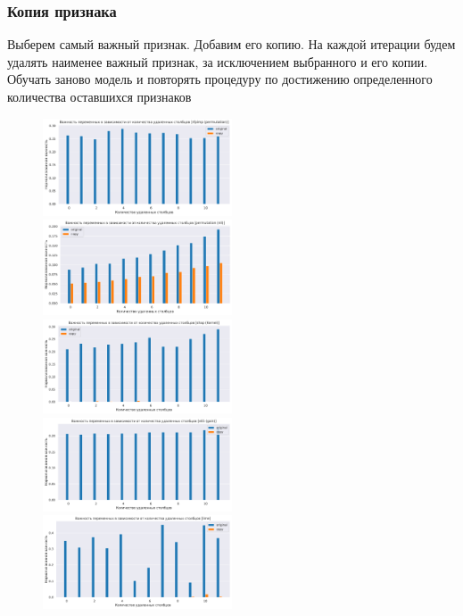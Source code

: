 \documentclass[12pt]{article}
\begin{document}
\subsubsection{Копия признака}
Выберем самый важный признак. Добавим его копию. На каждой итерации будем удалять наименее важный признак, за исключением выбранного и его копии. Обучать заново модель и повторять процедуру по достижению определенного количества оставшихся признаков
\begin{figure}[h]
        \includegraphics[width=0.5\textwidth]{images/art1_original_copy_lgbm_rfpimp (permutation).pdf}
        \includegraphics[width=0.5\textwidth]{images/art1_original_copy_lgbm_permutation (nll).pdf}
        \includegraphics[width=0.5\textwidth]{images/art1_original_copy_lgbm_shap (Kernel).pdf}
        \includegraphics[width=0.5\textwidth]{images/art1_original_copy_lgbm_eli5 (gain).pdf}
        \hfill
        \includegraphics[width=0.5\textwidth]{images/art1_original_copy_lgbm_lime.pdf}

\end{figure}
\end{document}
